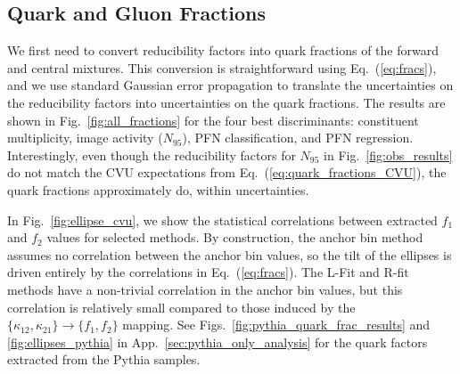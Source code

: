 \documentclass[aps,prd,twocolumn,preprintnumbers,nofootinbib,longbibliography,floatfix]{revtex4-1}
\DeclareRobustCommand{\Sec}[1]{Sec.~\ref{#1}}
\DeclareRobustCommand{\App}[1]{App.~\ref{#1}}
\DeclareRobustCommand{\Fig}[1]{Fig.~\ref{#1}}
\DeclareRobustCommand{\Figs}[2]{Figs.~\ref{#1} and \ref{#2}}
\DeclareRobustCommand{\Eq}[1]{Eq.~(\ref{#1})}
\newcommand{\Pythia}{{\sc Pythia}\xspace}
\begin{document}
\subsection{Quark and Gluon Fractions}

We first need to convert reducibility factors into quark fractions of the forward and central mixtures.
%
This conversion is straightforward using \Eq{eq:fracs}, and we use standard Gaussian error propagation to translate the uncertainties on the reducibility factors into uncertainties on the quark fractions.
%
The results are shown in \Fig{fig:all_fractions} for the four best discriminants:  constituent multiplicity, image activity ($N_{95}$), PFN classification, and PFN regression.
%
Interestingly, even though the reducibility factors for $N_{95}$ in \Fig{fig:obs_results} do not match the CVU expectations from \Eq{eq:quark_fractions_CVU}, the quark fractions approximately do, within uncertainties.



In \Fig{fig:ellipse_cvu}, we show the statistical correlations between extracted $f_1$ and $f_2$ values for selected methods.
%
By construction, the anchor bin method assumes no correlation between the anchor bin values, so the tilt of the ellipses is driven entirely by the correlations in \Eq{eq:fracs}.
%
The L-Fit and R-fit methods have a non-trivial correlation in the anchor bin values, but this correlation is relatively small compared to those induced by the $\{\kappa_{12}, \kappa_{21}\} \to \{f_1, f_2\}$ mapping.
%
See \Figs{fig:pythia_quark_frac_results}{fig:ellipses_pythia} in \App{sec:pythia_only_analysis} for the quark factors extracted from the \Pythia samples.




\begin{figure*}[p]
\centering
{}
\\
%
\caption{
Extracted ``quark'' (yellow, topic 1) and ``gluon" (green, topic 2) distributions for the six substructure observables from \Sec{subsec:observables}.
%
These are obtained by mixing the CMS 2011 Open Data CVU distributions from \Fig{fig:forw_vs_cent_gen} according the quark fractions from \Eq{eq:quark_fractions_PFN}.
%
For comparison, we show the same \Pythia truth-parton-labeled quark (blue dashed) and gluon (red dashed) distributions from \Fig{fig:forw_vs_cent_gen}.
%
The error bars correspond to statistical uncertainties on the distributions combined with the reducibility factor uncertainties in quadrature.
}
\label{fig:simqg}
\end{figure*}
\end{document}
